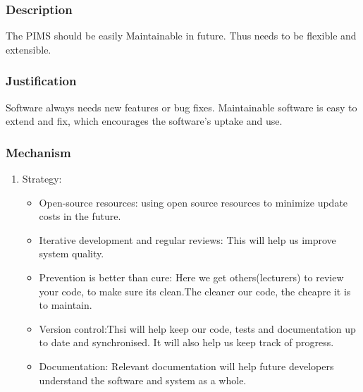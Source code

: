 \subsubsection*{Description}  \label{sec:maintainability}
The PIMS should be easily Maintainable in future. Thus needs to be flexible and extensible.
		
\subsubsection*{Justification}
Software always needs new features or bug fixes. Maintainable software is easy to extend and fix, which encourages the software's uptake and use.
	
	
\subsubsection*{Mechanism}	
\begin{enumerate}
\item Strategy:
	\begin{itemize}
		\item Open-source resources: using open source resources to minimize update costs in the future.
		\item Iterative development and regular reviews: This will help us improve system quality.
		\item Prevention is better than cure: Here we get others(lecturers) to review your code, to make sure its clean.The cleaner our code, the cheapre it is to maintain.
		\item Version control:Thsi will help keep our code, tests and documentation up to date and synchronised. It will also help us keep track of progress.
		\item Documentation: Relevant documentation will help future developers understand the software and system as a whole.
\end{itemize}
					
\end{enumerate}